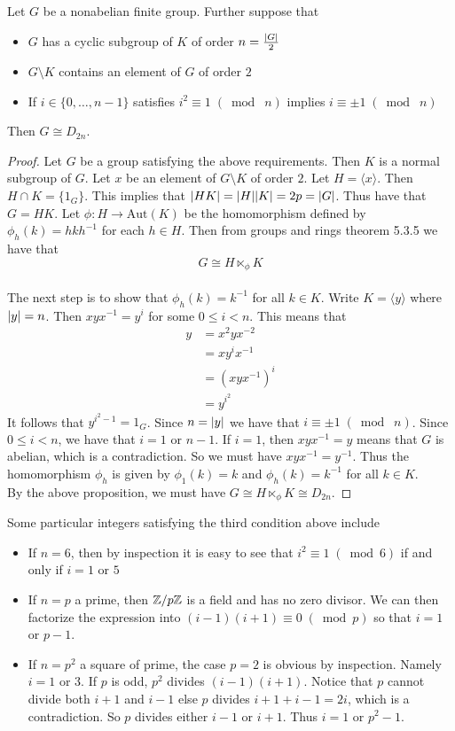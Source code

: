 \documentclass[a4paper]{article}
\begin{document}
\begin{thm}{}{} Let $G$ be a nonabelian finite group. Further suppose that 
\begin{itemize}
\item $G$ has a cyclic subgroup of $K$ of order $n=\frac{\abs{G}}{2}$
\item $G\setminus K$ contains an element of $G$ of order $2$
\item If $i\in\{0,\dots,n-1\}$ satisfies $i^2\equiv 1\;(\bmod\; n)$ implies $i\equiv \pm 1\;(\bmod\; n)$
\end{itemize}
Then $G\cong D_{2n}$. 
\begin{proof}
Let $G$ be a group satisfying the above requirements. Then $K$ is a normal subgroup of $G$. Let $x$ be an element of $G\setminus K$ of order $2$. Let $H=\langle x\rangle$. Then $H\cap K=\{1_G\}$. This implies that $\abs{HK}=\abs{H}\abs{K}=2p=\abs{G}$. Thus have that $G=HK$. Let $\phi:H\to\text{Aut}(K)$ be the homomorphism defined by $\phi_h(k)=hkh^{-1}$ for each $h\in H$. Then from groups and rings theorem 5.3.5 we have that $$G\cong H\ltimes_\phi K$$~\\

The next step is to show that $\phi_h(k)=k^{-1}$ for all $k\in K$. Write $K=\langle y\rangle$ where $\abs{y}=n$. Then $xyx^{-1}=y^i$ for some $0\leq i<n$. This means that 
\begin{align*}
y&=x^2yx^{-2}\tag{$x^2=1$}\\
&=xy^ix^{-1}\\
&=(xyx^{-1})^i\\
&=y^{i^2}
\end{align*}
It follows that $y^{i^2-1}=1_G$. Since $n=\abs{y}$ we have that $i\equiv\pm1\;(\bmod\;n)$. Since $0\leq i<n$, we have that $i=1$ or $n-1$. If $i=1$, then $xyx^{-1}=y$ means that $G$ is abelian, which is a contradiction. So we must have $xyx^{-1}=y^{-1}$. Thus the homomorphism $\phi_h$ is given by $\phi_1(k)=k$ and $\phi_h(k)=k^{-1}$ for all $k\in K$. \\

By the above proposition, we must have $G\cong H\ltimes_\phi K\cong D_{2n}$. 
\end{proof}
\end{thm}

Some particular integers satisfying the third condition above include
\begin{itemize}
\item If $n=6$, then by inspection it is easy to see that $i^2\equiv 1\;(\bmod 6)$ if and only if $i=1$ or $5$
\item If $n=p$ a prime, then $\mathbb{Z}/p\mathbb{Z}$ is a field and has no zero divisor. We can then factorize the expression into $(i-1)(i+1)\equiv 0\;(\bmod p)$ so that $i=1$ or $p-1$. 
\item If $n=p^2$ a square of prime, the case $p=2$ is obvious by inspection. Namely $i=1$ or $3$. If $p$ is odd, $p^2$ divides $(i-1)(i+1)$. Notice that $p$ cannot divide both $i+1$ and $i-1$ else $p$ divides $i+1+i-1=2i$, which is a contradiction. So $p$ divides either $i-1$ or $i+1$. Thus $i=1$ or $p^2-1$. 
\end{itemize}
\end{document}
